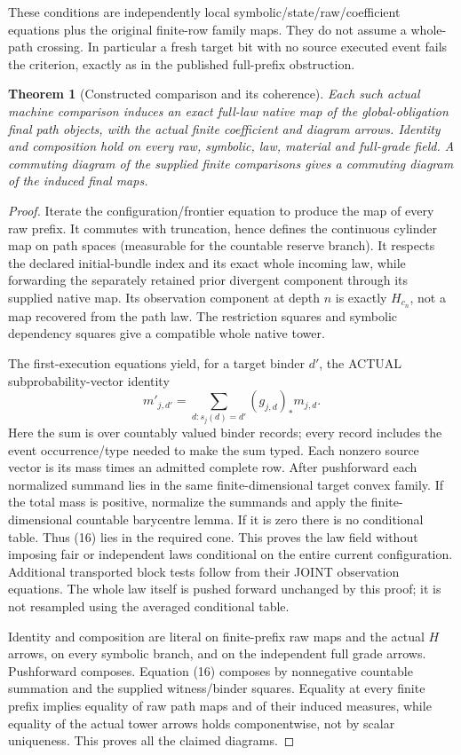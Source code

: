 \documentclass[11pt]{article}
\newtheorem{theorem}{Theorem}\newtheorem{proposition}{Proposition}
\begin{document}
These conditions are independently local symbolic/state/raw/coefficient equations plus the original finite-row family maps. They do not assume a whole-path crossing. In particular a fresh target bit with no source executed event fails the criterion, exactly as in the published full-prefix obstruction.

\begin{theorem}[Constructed comparison and its coherence]
Each such actual machine comparison induces an exact full-law native map of the global-obligation final path objects, with the actual finite coefficient and diagram arrows. Identity and composition hold on every raw, symbolic, law, material and full-grade field. A commuting diagram of the supplied finite comparisons gives a commuting diagram of the induced final maps.
\end{theorem}
\begin{proof}
Iterate the configuration/frontier equation to produce the map of every raw prefix. It commutes with truncation, hence defines the continuous cylinder map on path spaces (measurable for the countable reserve branch). It respects the declared initial-bundle index and its exact whole incoming law, while forwarding the separately retained prior divergent component through its supplied native map. Its observation component at depth $n$ is exactly $H_{c_n}$, not a map recovered from the path law. The restriction squares and symbolic dependency squares give a compatible whole native tower.

The first-execution equations yield, for a target binder $d'$, the ACTUAL subprobability-vector identity
\[
 m'_{j,d'}=\sum_{d:s_j(d)=d'}(g_{j,d})_*m_{j,d}.          \tag{16}
\]
Here the sum is over countably valued binder records; every record includes the event occurrence/type needed to make the sum typed. Each nonzero source vector is its mass times an admitted complete row. After pushforward each normalized summand lies in the same finite-dimensional target convex family. If the total mass is positive, normalize the summands and apply the finite-dimensional countable barycentre lemma. If it is zero there is no conditional table. Thus (16) lies in the required cone. This proves the law field without imposing fair or independent laws conditional on the entire current configuration. Additional transported block tests follow from their JOINT observation equations. The whole law itself is pushed forward unchanged by this proof; it is not resampled using the averaged conditional table.

Identity and composition are literal on finite-prefix raw maps and the actual $H$ arrows, on every symbolic branch, and on the independent full grade arrows. Pushforward composes. Equation (16) composes by nonnegative countable summation and the supplied witness/binder squares. Equality at every finite prefix implies equality of raw path maps and of their induced measures, while equality of the actual tower arrows holds componentwise, not by scalar uniqueness. This proves all the claimed diagrams.
\end{proof}
\end{document}
